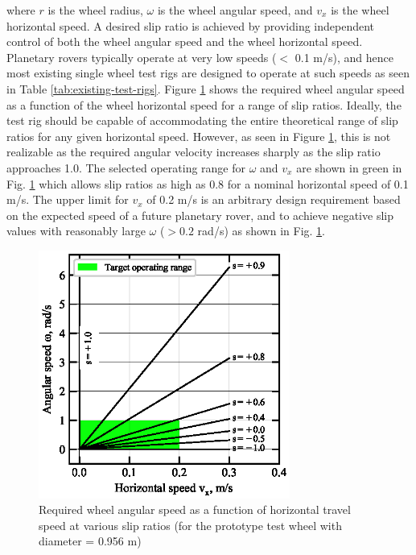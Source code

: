 \documentclass{article}
\begin{document}
where $r$ is the wheel radius, $\omega$ is the wheel angular speed, and $v_x$ is the wheel horizontal speed. A desired slip ratio is achieved by providing independent control of both the wheel angular speed and the wheel horizontal speed. Planetary rovers typically operate at very low speeds ($<$ 0.1 m/s), and hence most existing single wheel test rigs are designed to operate at such speeds as seen in Table \ref{tab:existing-test-rigs}. Figure \ref{fig:slip-ratio-chart} shows the required wheel angular speed as a function of the wheel horizontal speed for a range of slip ratios. Ideally, the test rig should be capable of accommodating the entire theoretical range of slip ratios for any given horizontal speed. However, as seen in Figure \ref{fig:slip-ratio-chart}, this is not realizable as the required angular velocity increases sharply as the slip ratio approaches 1.0. The selected operating range for $\omega$ and $v_x$ are shown in green in Fig. \ref{fig:slip-ratio-chart} which allows slip ratios as high as 0.8 for a nominal horizontal speed of 0.1 m/s. The upper limit for $v_x$ of 0.2 m/s is an arbitrary design requirement based on the expected speed of a future planetary rover, and to achieve negative slip values with reasonably large $\omega$ ($> 0.2$ rad/s) as shown in Fig. \ref{fig:slip-ratio-chart}. 


\begin{figure}[hbt!]
\centering
\includegraphics[width=3.25in]{plots/slip-ratios.eps}
\caption{Required wheel angular speed as a function of horizontal travel speed at various slip ratios (for the prototype test wheel with diameter = 0.956 m)}
\label{fig:slip-ratio-chart}
\end{figure}
\end{document}
